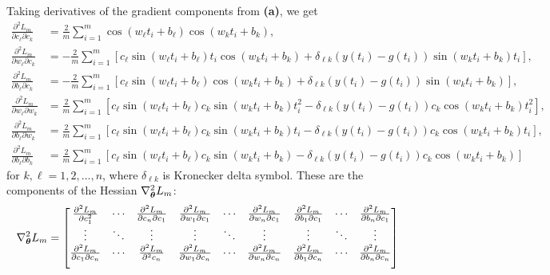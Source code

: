 \documentclass{homework}
\begin{document}
\begin{alphaparts}
		\questionpart Taking derivatives of the gradient components from \textbf{(a)}, we get
		\begin{align*}
			\frac{\partial^2 L_m}{\partial c_\ell \partial c_k} &= \frac{2}{m}\sum_{i=1}^m \cos(w_\ell t_i + b_\ell)\cos(w_kt_i + b_k), \\
			\frac{\partial^2 L_m}{\partial w_\ell \partial c_k} &= -\frac{2}{m}\sum_{i=1}^m\left[ c_\ell\sin(w_\ell t_i + b_\ell)t_i\cos(w_kt_i + b_k) + \delta_{\ell k}(y(t_i) - g(t_i))\sin(w_kt_i + b_k)t_i\right], \\
			\frac{\partial^2 L_m}{\partial b_\ell \partial c_k} &= -\frac{2}{m}\sum_{i=1}^m\left[ c_\ell\sin(w_\ell t_i + b_\ell)\cos(w_kt_i + b_k) + \delta_{\ell k}(y(t_i) - g(t_i))\sin(w_kt_i+b_k)\right], \\
			\frac{\partial^2 L_m}{\partial w_\ell \partial w_k} &= \frac{2}{m}\sum_{i=1}^m \left[c_\ell \sin(w_\ell t_i + b_\ell)c_k\sin(w_kt_i + b_k)t_i^2 - \delta_{\ell k}(y(t_i) - g(t_i))c_k\cos(w_kt_i+b_k)t_i^2 \right], \\
			\frac{\partial^2 L_m}{\partial b_\ell \partial w_k} &= \frac{2}{m}\sum_{i=1}^m\left[c_\ell\sin(w_\ell t_i +b_\ell)c_k\sin(w_kt_i + b_k)t_i - \delta_{\ell k}(y(t_i) - g(t_i))c_k\cos(w_kt_i + b_k)t_i\right], \\
			\frac{\partial^2 L_m}{\partial b_\ell \partial b_k} &= \frac{2}{m}\sum_{i=1}^m\left[c_\ell\sin(w_\ell t_i + b_\ell)c_k\sin(w_kt_i + b_k) - \delta_{\ell k}(y(t_i) - g(t_i))c_k\cos(w_kt_i + b_k)\right]
		\end{align*}
		for $k,\ell = 1,2,\dots, n$, where $\delta_{\ell k}$ is Kronecker delta symbol. These are the components of the Hessian $\nabla^2_{\boldsymbol{\theta}}L_m$:
		\begin{equation*}
			\nabla_{\boldsymbol{\theta}}^2L_m = \left[\begin{matrix}
				\frac{\partial^2 L_m}{\partial c_1^2} &  \cdots  & \frac{\partial^2 L_m}{\partial c_n\partial c_1} & \frac{\partial^2 L_m}{\partial w_1\partial c_1} & \cdots & \frac{\partial^2 L_m}{\partial w_n\partial c_1} & \frac{\partial^2L_m}{\partial b_1\partial c_1} & \cdots & \frac{\partial^2L_m}{\partial b_n\partial c_1} \\
				\vdots & \ddots & \vdots & \vdots & \ddots & \vdots & \vdots & \ddots & \vdots \\
				\frac{\partial^2L_m}{\partial c_1\partial c_n} & \cdots & \frac{\partial^2L_m}{\partial^2c_n} & \frac{\partial^2L_m}{\partial w_1\partial c_n} & \cdots & \frac{\partial^2L_m}{\partial w_n\partial c_n} & \frac{\partial^2L_m}{\partial b_1\partial c_n} & \cdots & \frac{\partial^2L_m}{\partial b_n\partial c_n} \\[1em]
\end{matrix}\right]
\end{equation*}
\end{alphaparts}
\end{document}
